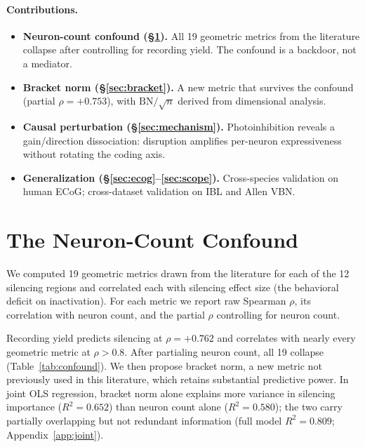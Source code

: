 \documentclass{article}
\begin{document}
\paragraph{Contributions.}
\begin{itemize}
\item \textbf{Neuron-count confound (\S\ref{sec:confound}).} All 19 geometric metrics from the literature collapse after controlling for recording yield. The confound is a backdoor, not a mediator.
\item \textbf{Bracket norm (\S\ref{sec:bracket}).} A new metric that survives the confound (partial $\rho = +0.753$), with $\text{BN}/\!\sqrt{n}$ derived from dimensional analysis.
\item \textbf{Causal perturbation (\S\ref{sec:mechanism}).} Photoinhibition reveals a gain/direction dissociation: disruption amplifies per-neuron expressiveness without rotating the coding axis.
\item \textbf{Generalization (\S\ref{sec:ecog}--\ref{sec:scope}).} Cross-species validation on human ECoG; cross-dataset validation on IBL and Allen VBN.
\end{itemize}

\section{The Neuron-Count Confound}
\label{sec:confound}

We computed 19 geometric metrics drawn from the literature for each of the 12 silencing regions and correlated each with silencing effect size (the behavioral deficit on inactivation). For each metric we report raw Spearman $\rho$, its correlation with neuron count, and the partial $\rho$ controlling for neuron count.

Recording yield predicts silencing at $\rho = +0.762$ and correlates with nearly every geometric metric at $\rho > 0.8$. After partialing neuron count, all 19 collapse (Table~\ref{tab:confound}). We then propose bracket norm, a new metric not previously used in this literature, which retains substantial predictive power. In joint OLS regression, bracket norm alone explains more variance in silencing importance ($R^2 = 0.652$) than neuron count alone ($R^2 = 0.580$); the two carry partially overlapping but not redundant information (full model $R^2 = 0.809$; Appendix~\ref{app:joint}).
\end{document}
